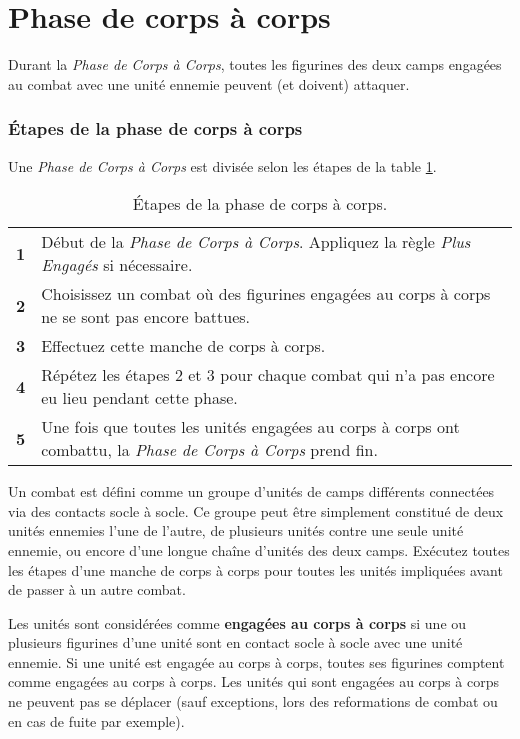 
\part{Phase de corps à corps}

Durant la \emph{Phase de Corps à Corps}, toutes les figurines des deux camps engagées au combat avec une unité ennemie peuvent (et doivent) attaquer.

\section{Étapes de la phase de corps à corps}

Une \emph{Phase de Corps à Corps} est divisée selon les étapes de la table \ref{table/etapes_cac}.

\begin{table}[!htbp]
\centering
\begin{tabular}{c|m{12cm}}
\textbf{1} & Début de la \emph{Phase de Corps à Corps}. Appliquez la règle \emph{Plus Engagés} si nécessaire. \tabularnewline
\textbf{2} & Choisissez un combat où des figurines engagées au corps à corps ne se sont pas encore battues. \tabularnewline
\textbf{3} & Effectuez cette manche de corps à corps. \tabularnewline
\textbf{4} & Répétez les étapes 2 et 3 pour chaque combat qui n'a pas encore eu lieu pendant cette phase. \tabularnewline
\textbf{5} & Une fois que toutes les unités engagées au corps à corps ont combattu, la \emph{Phase de Corps à Corps} prend fin. \tabularnewline
\end{tabular}
\caption{\label{table/etapes_cac}Étapes de la phase de corps à corps.}
\end{table}

Un combat est défini comme un groupe d'unités de camps différents connectées via des contacts socle à socle. Ce groupe peut être simplement constitué de deux unités ennemies l'une de l'autre, de plusieurs unités contre une seule unité ennemie, ou encore d'une longue chaîne d'unités des deux camps. Exécutez toutes les étapes d'une manche de corps à corps pour toutes les unités impliquées avant de passer à un autre combat.

Les unités sont considérées comme \textbf{engagées au corps à corps} si une ou plusieurs figurines d'une unité sont en contact socle à socle avec une unité ennemie. Si une unité est engagée au corps à corps, toutes ses figurines comptent comme engagées au corps à corps. Les unités qui sont engagées au corps à corps ne peuvent pas se déplacer (sauf exceptions, lors des reformations de combat ou en cas de fuite par exemple).

